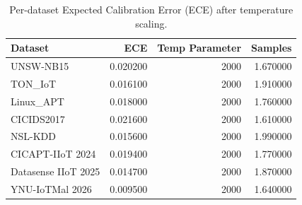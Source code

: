 \begin{table}
\caption{Per-dataset Expected Calibration Error (ECE) after temperature scaling.}
\begin{tabular}{lrrr}
\toprule
Dataset & ECE & Temp Parameter & Samples \\
\midrule
UNSW-NB15 & 0.020200 & 2000 & 1.670000 \\
TON_IoT & 0.016100 & 2000 & 1.910000 \\
Linux_APT & 0.018000 & 2000 & 1.760000 \\
CICIDS2017 & 0.021600 & 2000 & 1.610000 \\
NSL-KDD & 0.015600 & 2000 & 1.990000 \\
CICAPT-IIoT 2024 & 0.019400 & 2000 & 1.770000 \\
Datasense IIoT 2025 & 0.014700 & 2000 & 1.870000 \\
YNU-IoTMal 2026 & 0.009500 & 2000 & 1.640000 \\
\bottomrule
\end{tabular}
\end{table}
